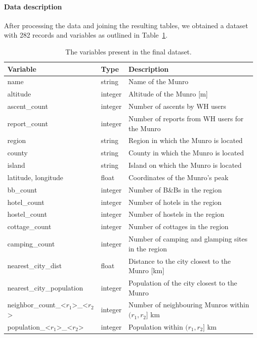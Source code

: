 \documentclass[11pt,a4paper]{article}
\begin{document}
\paragraph{Data description} 

After processing the data and joining the resulting tables, we obtained a dataset with 282 records and variables as outlined in Table~\ref{table:1}.

\begin{table}[h!]
    \caption{The variables present in the final dataset.}
    \label{table:1}
    \centering
    \begin{tabular}{l  l  l} 
        \toprule
        Variable & Type & Description  \\ 
        \midrule
        name & string & Name of the Munro \\ 
        altitude & integer & Altitude of the Munro [m] \\
        \hline
        ascent\_count & integer & Number of ascents by WH users\\
        report\_count & integer & Number of reports from WH users for the Munro\\
        \hline
        region & string & Region in which the Munro is located \\
        county & string & County in which the Munro is located\\
        island & string & Island on which the Munro is located\\
        latitude, longitude & float & Coordinates of the Munro's peak\\
        \hline
        bb\_count & integer & Number of B\&Bs in the region\\
        hotel\_count & integer & Number of hotels in the region\\
        hostel\_count & integer & Number of hostels in the region\\
        cottage\_count & integer & Number of cottages in the region\\
        camping\_count & integer & Number of camping and glamping sites in the region\\
        \hline
        nearest\_city\_dist & float & Distance to the city closest to the Munro [km]\\
        nearest\_city\_population & integer & Population of the city closest to the Munro\\
        neighbor\_count\_<$r_1$>\_<$r_2$> & integer & Number of neighbouring Munros within $(r_1,r_2]$ km\\
        population\_<$r_1$>\_<$r_2$> & integer & Population within $(r_1,r_2]$ km\\
        \bottomrule
    \end{tabular}
\end{table}
\end{document}
